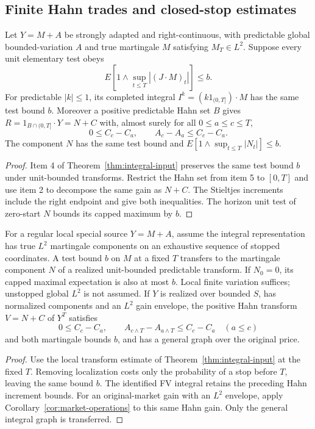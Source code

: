 \subsection{Finite Hahn trades and closed-stop estimates}
\label{sec:finite-hahn-proof}
\begin{proposition}
Let $Y=M+A$ be strongly adapted and right-continuous, with predictable global
bounded-variation $A$ and true martingale $M$ satisfying $M_T\in L^2$.
Suppose every unit elementary test obeys
\[
 E\left[1\wedge\sup_{t\leq T}|(J\cdot M)_t|\right]\leq b.
\]
For predictable $|k|\leq1$, its completed integral
$I^k=(k1_{(0,T]})\cdot M$ has the same test bound $b$.
Moreover a positive predictable Hahn set $B$ gives
$R=1_{B\cap(0,T]}\cdot Y=N+C$ with, almost surely for all $0\leq a\leq c\leq T$,
\[
 0\leq C_c-C_a,\qquad A_c-A_a\leq C_c-C_a.
\]
The component $N$ has the same test bound and
$E[1\wedge\sup_{t\leq T}|N_t|]\leq b$.
\end{proposition}
\begin{proof}
Item 4 of Theorem~\ref{thm:integral-input} preserves the same test bound $b$ under unit-bounded transforms. Restrict the Hahn set from item 5 to $[0,T]$ and use item 2 to decompose the same gain as $N+C$. The Stieltjes increments include the right endpoint and give both inequalities. The horizon unit test of zero-start $N$ bounds its capped maximum by $b$.
\end{proof}
\begin{proposition}
For a regular local special source $Y=M+A$, assume the integral representation has true $L^2$ martingale components on an exhaustive sequence of stopped coordinates. A test bound $b$ on $M$ at a fixed
$T$ transfers to the martingale component $N$ of a realized unit-bounded
predictable transform. If $N_0=0$, its capped maximal expectation is also at
most $b$. Local finite variation suffices; unstopped global $L^2$ is not assumed.
If $Y$ is realized over bounded $S$, has normalized components and an $L^2$
gain envelope, the positive Hahn transform $V=N+C$ of $Y^T$ satisfies
\[
 0\leq C_c-C_a,\qquad A_{c\wedge T}-A_{a\wedge T}\leq C_c-C_a\quad(a\leq c)
\]
and both martingale bounds $b$, and has a general graph over the original price.
\end{proposition}
\begin{proof}
Use the local transform estimate of Theorem~\ref{thm:integral-input} at the fixed $T$. Removing localization costs only the probability of a stop before $T$, leaving the same bound $b$. The identified FV integral retains the preceding Hahn increment bounds. For an original-market gain with an $L^2$ envelope, apply Corollary~\ref{cor:market-operations} to this same Hahn gain. Only the general integral graph is transferred.
\end{proof}

